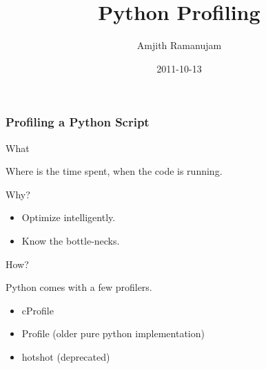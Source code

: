 \documentclass[t]{beamer}
\begin{document}
\title[Python Profiling]{Python Profiling%
  \label{python-profiling}}
\author[Amjith Ramanujam]{Amjith Ramanujam}
\date{2011-10-13}
\maketitle















\begin{frame}[fragile]
\frametitle{Profiling a Python Script}


\begin{block}{ What }

Where is the time spent, when the code is running.

\end{block}

\pause

\begin{block}{ Why? }
\begin{itemize}

\item Optimize intelligently.

\item Know the bottle-necks.
\end{itemize}

\end{block}

\pause

\begin{block}{ How? }

Python comes with a few profilers.
\begin{itemize}

\item cProfile

\item Profile  (older pure python implementation)

\item hotshot  (deprecated)
\end{itemize}

\end{block}
\end{frame}
\end{document}

